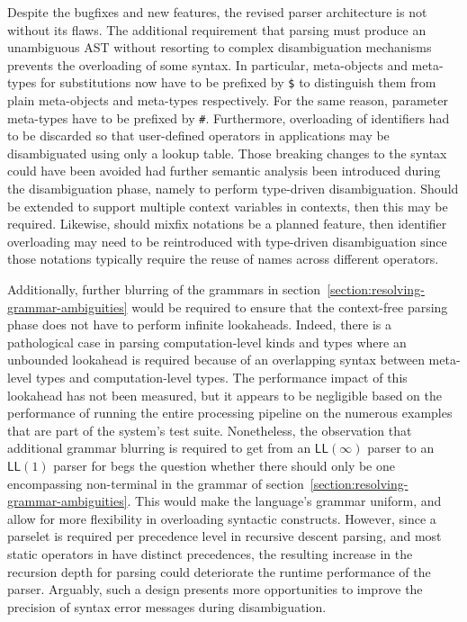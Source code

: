 Despite the bugfixes and new features, the revised parser architecture is not without its flaws.
The additional requirement that parsing must produce an unambiguous \ac{AST} without resorting to complex disambiguation mechanisms prevents the overloading of some syntax.
In particular, meta-objects and meta-types for substitutions now have to be prefixed by \texttt{\$} to distinguish them from plain meta-objects and meta-types respectively.
For the same reason, parameter meta-types have to be prefixed by \texttt{\#}.
Furthermore, overloading of identifiers had to be discarded so that user-defined operators in applications may be disambiguated using only a lookup table.
Those breaking changes to the syntax could have been avoided had further semantic analysis been introduced during the disambiguation phase, namely to perform type-driven disambiguation.
Should \Beluga be extended to support multiple context variables in contexts, then this may be required.
Likewise, should mixfix notations be a planned feature, then identifier overloading may need to be reintroduced with type-driven disambiguation since those notations typically require the reuse of names across different operators.

Additionally, further blurring of the grammars in section~\ref{section:resolving-grammar-ambiguities} would be required to ensure that the context-free parsing phase does not have to perform infinite lookaheads.
Indeed, there is a pathological case in parsing computation-level kinds and types where an unbounded lookahead is required because of an overlapping syntax between meta-level types and computation-level types.
The performance impact of this lookahead has not been measured, but it appears to be negligible based on the performance of running the entire processing pipeline on the numerous examples that are part of the system's test suite.
Nonetheless, the observation that additional grammar blurring is required to get from an $ \mathsf{LL}(\infty) $ parser to an $ \mathsf{LL}(1) $ parser for \Beluga begs the question whether there should only be one encompassing non-terminal in the grammar of section~\ref{section:resolving-grammar-ambiguities}.
This would make the language's grammar uniform, and allow for more flexibility in overloading syntactic constructs.
However, since a parselet is required per precedence level in recursive descent parsing, and most static operators in \Beluga have distinct precedences, the resulting increase in the recursion depth for parsing could deteriorate the runtime performance of the parser.
Arguably, such a design presents more opportunities to improve the precision of syntax error messages during disambiguation.
